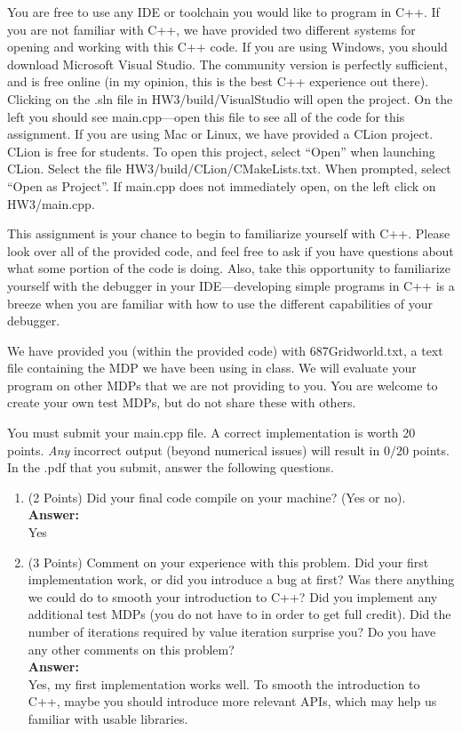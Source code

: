 \documentclass[]{article}
\begin{document}
You are free to use any IDE or toolchain you would like to program in C++. If you are not familiar with C++, we have provided two different systems for opening and working with this C++ code. If you are using Windows, you should download Microsoft Visual Studio. The community version is perfectly sufficient, and is free online (in my opinion, this is the best C++ experience out there). Clicking on the .sln file in HW3/build/VisualStudio will open the project. On the left you should see main.cpp---open this file to see all of the code for this assignment. If you are using Mac or Linux, we have provided a CLion project. CLion is free for students. To open this project, select ``Open'' when launching CLion. Select the file HW3/build/CLion/CMakeLists.txt. When prompted, select ``Open as Project''. If main.cpp does not immediately open, on the left click on HW3/main.cpp.

This assignment is your chance to begin to familiarize yourself with C++. Please look over all of the provided code, and feel free to ask if you have questions about what some portion of the code is doing. Also, take this opportunity to familiarize yourself with the debugger in your IDE---developing simple programs in C++ is a breeze when you are familiar with how to use the different capabilities of your debugger.

We have provided you (within the provided code) with 687Gridworld.txt, a text file containing the MDP we have been using in class. We will evaluate your program on other MDPs that we are not providing to you. You are welcome to create your own test MDPs, but do not share these with others.

You must submit your main.cpp file. A correct implementation is worth 20 points. \textit{Any} incorrect output (beyond numerical issues) will result in $0/20$ points. In the .pdf that you submit, answer the following questions.

\begin{enumerate}
    \item (2 Points) Did your final code compile on your machine? (Yes or no).
    \\
    \textbf{Answer:}\\
    Yes
    \item (3 Points) Comment on your experience with this problem. Did your first implementation work, or did you introduce a bug at first? Was there anything we could do to smooth your introduction to C++? Did you implement any additional test MDPs (you do not have to in order to get full credit). Did the number of iterations required by value iteration surprise you? Do you have any other comments on this problem?
    \\
    \textbf{Answer:}\\
    Yes, my first implementation works well. To smooth the introduction to C++, maybe you should introduce more relevant APIs, which may help us familiar with usable libraries.
\end{enumerate}
\end{document}

